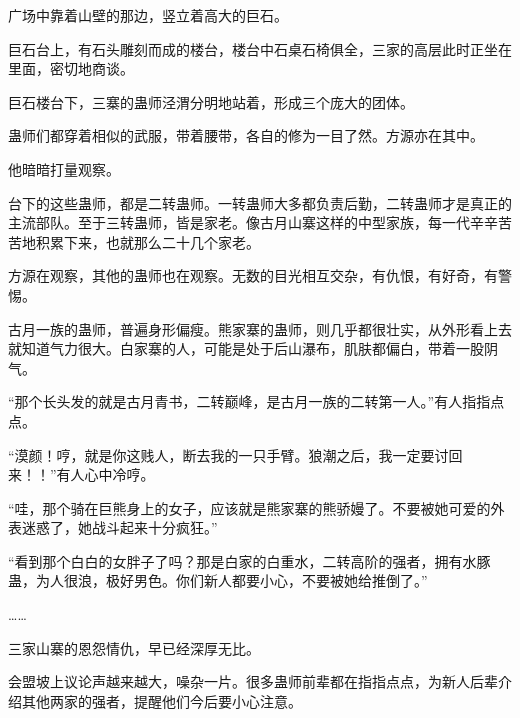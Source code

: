 \begin{this_body}
广场中靠着山壁的那边，竖立着高大的巨石。

巨石台上，有石头雕刻而成的楼台，楼台中石桌石椅俱全，三家的高层此时正坐在里面，密切地商谈。

巨石楼台下，三寨的蛊师泾渭分明地站着，形成三个庞大的团体。

蛊师们都穿着相似的武服，带着腰带，各自的修为一目了然。方源亦在其中。

他暗暗打量观察。

台下的这些蛊师，都是二转蛊师。一转蛊师大多都负责后勤，二转蛊师才是真正的主流部队。至于三转蛊师，皆是家老。像古月山寨这样的中型家族，每一代辛辛苦苦地积累下来，也就那么二十几个家老。

方源在观察，其他的蛊师也在观察。无数的目光相互交杂，有仇恨，有好奇，有警惕。

古月一族的蛊师，普遍身形偏瘦。熊家寨的蛊师，则几乎都很壮实，从外形看上去就知道气力很大。白家寨的人，可能是处于后山瀑布，肌肤都偏白，带着一股阴气。

“那个长头发的就是古月青书，二转巅峰，是古月一族的二转第一人。”有人指指点点。

“漠颜！哼，就是你这贱人，断去我的一只手臂。狼潮之后，我一定要讨回来！！”有人心中冷哼。

“哇，那个骑在巨熊身上的女子，应该就是熊家寨的熊骄嫚了。不要被她可爱的外表迷惑了，她战斗起来十分疯狂。”

“看到那个白白的女胖子了吗？那是白家的白重水，二转高阶的强者，拥有水豚蛊，为人很浪，极好男色。你们新人都要小心，不要被她给推倒了。”

……

三家山寨的恩怨情仇，早已经深厚无比。

会盟坡上议论声越来越大，噪杂一片。很多蛊师前辈都在指指点点，为新人后辈介绍其他两家的强者，提醒他们今后要小心注意。

\end{this_body}

